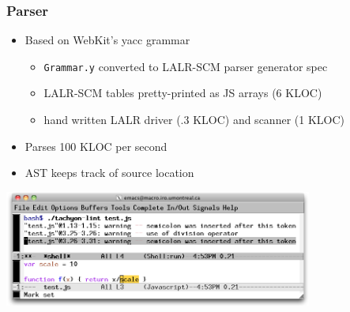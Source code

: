 \begin{frame}
\frametitle{\bf Parser}

  \begin{itemize}

  \item Based on WebKit's yacc grammar
    \begin{itemize}
    \item {\tt Grammar.y} converted to LALR-SCM parser generator spec
    \item LALR-SCM tables pretty-printed as JS arrays (6 KLOC)
    \item hand written LALR driver (.3 KLOC) and scanner (1 KLOC)
    \end{itemize}
    \smallskip

  \item Parses 100 KLOC per second
    \smallskip

  \item AST keeps track of source location

  \end{itemize}

  \begin{center}
    \includegraphics[height=1.5in]{images/tachyon-lint.png}
  \end{center}

\end{frame}

